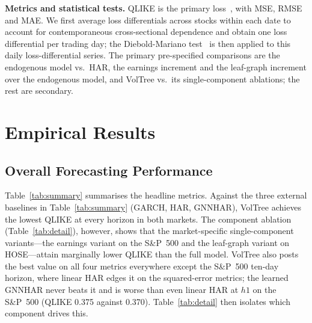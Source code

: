 \documentclass[runningheads,a4paper]{llncs}
\begin{document}
\textbf{Metrics and statistical tests.} QLIKE is the primary loss~\cite{patton2011}, with MSE, RMSE and
MAE. We first average loss differentials across stocks within each date to account for contemporaneous
cross-sectional dependence and obtain one loss differential per trading day; the Diebold-Mariano
test~\cite{dm1995} is then applied to this daily loss-differential series. The primary pre-specified comparisons are the endogenous model vs.\ HAR, the earnings increment and the leaf-graph increment over the endogenous model, and VolTree vs.\ its single-component ablations; the rest are secondary.


\section{Empirical Results}

\subsection{Overall Forecasting Performance}
Table~\ref{tab:summary} summarises the headline metrics. Against the three external baselines in
Table~\ref{tab:summary} (GARCH, HAR, GNNHAR), VolTree achieves the lowest QLIKE at every horizon in
both markets. The component ablation (Table~\ref{tab:detail}), however, shows that the market-specific
single-component variants---the earnings variant on the S\&P~500 and the leaf-graph variant on HOSE---attain marginally lower QLIKE than the full model. VolTree also posts the best value on all four metrics
everywhere except the S\&P~500 ten-day horizon, where linear HAR edges it on the squared-error metrics; the
learned GNNHAR never beats it and is worse than even linear HAR at $h1$ on the S\&P~500 (QLIKE 0.375 against
0.370). Table~\ref{tab:detail} then isolates which component drives this.
\end{document}
